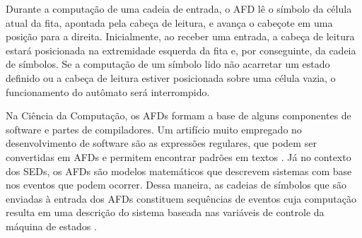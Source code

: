 
Durante a computação de uma cadeia de entrada, o AFD lê o símbolo da célula atual da fita, apontada pela cabeça de leitura, e avança o cabeçote em uma posição para a direita. Inicialmente, ao receber uma entrada, a cabeça de leitura estará posicionada na extremidade esquerda da fita e, por conseguinte, da cadeia de símbolos. Se a computação de um símbolo lido não acarretar um estado definido ou a cabeça de leitura estiver posicionada sobre uma célula vazia, o funcionamento do autômato será interrompido.

Na Ciência da Computação, os AFDs formam a base de alguns componentes de software e partes de compiladores. Um artifício muito empregado no desenvolvimento de software são as expressões regulares, que podem ser convertidas em AFDs e permitem encontrar padrões em textos \cite{hopcroft}. Já no contexto dos \acs{SED}s, os AFDs são modelos matemáticos que descrevem sistemas com base nos eventos que podem ocorrer. Dessa maneira, as cadeias de símbolos que são enviadas à entrada dos AFDs constituem sequências de eventos cuja computação resulta em uma descrição do sistema baseada nas variáveis de controle da máquina de estados \cite{cassandras}.

